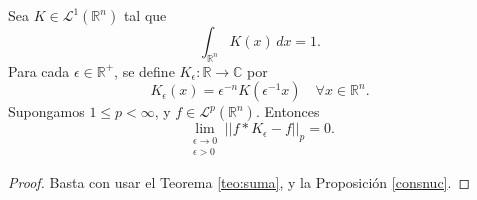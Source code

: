 \begin{corolario} \label{coro:coro}
    Sea $K  \in \mathscr{L}^1(\mathbb{R}^n)$ tal que 
    \begin{equation}
        \int_{\mathbb{R}^n}K(x) \, dx = 1.
    \end{equation}
    Para cada $\epsilon \in \mathbb{R}^+$, se define $K_{\epsilon}: \mathbb{R} \rightarrow \mathbb{C}$ por
    \begin{equation}
        K_{\epsilon}(x) = \epsilon^{-n}K(\epsilon^{-1}x) \quad \forall x \in \mathbb{R}^n.
    \end{equation}
     Supongamos $1 \leq p < \infty$, y $f \in \mathscr{L}^p(\mathbb{R}^n)$. Entonces
    \begin{equation}
        \lim_{\substack{\epsilon \rightarrow 0 \\ \epsilon > 0}} ||f* K_{\epsilon}-f||_p=0.
    \end{equation}
\end{corolario}


\begin{proof}
    Basta con usar el Teorema \ref{teo:suma}, y la Proposición \ref{consnuc}.
\end{proof}




